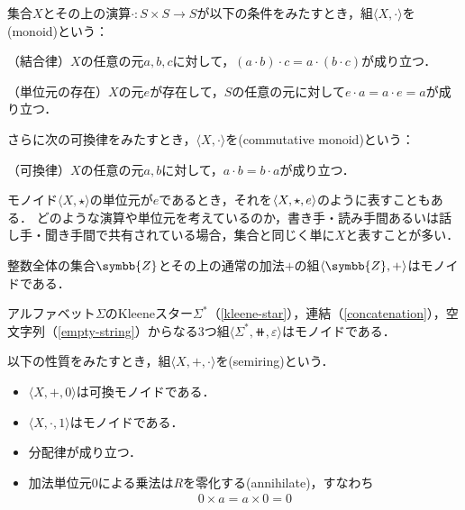 \documentclass[../main.tex]{subfiles}
\begin{document}
\begin{thmbox}
\begin{definition} 集合\(X\)とその上の演算\(\mathord{\cdot}\colon S \times S \to S\)が以下の条件をみたすとき，組\(\langle X, \mathord{\cdot} \rangle\)を(monoid)という：
\begin{conditions}
    \item （結合律）\(X\)の任意の元\(a, b, c\)に対して，\((a \cdot b) \cdot c = a \cdot (b \cdot c)\)が成り立つ．
    \item （単位元の存在）\(X\)の元\(e\)が存在して，\(S\)の任意の元に対して\(e \cdot a = a \cdot e = a\)が成り立つ．
\end{conditions}
さらに次の可換律をみたすとき，\(\langle X, \mathord{\cdot} \rangle\)を(commutative monoid)という：
\begin{conditions}[resume]
    \item （可換律）\(X\)の任意の元\(a, b\)に対して，\(a \cdot b = b \cdot a\)が成り立つ．
\end{conditions}
\end{definition}
\end{thmbox}

モノイド\(\langle X, \mathord{\star} \rangle\)の単位元が\(e\)であるとき，それを\(\langle  X, \mathord{\star}, e  \rangle\)のように表すこともある．
どのような演算や単位元を考えているのか，書き手・読み手間あるいは話し手・聞き手間で共有されている場合，集合と同じく単に\(X\)と表すことが多い．

\begin{exa} 整数全体の集合\(\symbb{Z}\)とその上の通常の加法\(\mathord{+}\)の組\(\tuple{ \symbb{Z}, \mathord{+} }\)はモノイドである．
\end{exa}

\begin{exa} アルファベット\(\Sigma\)のKleeneスター\(\Sigma^{\mathord{*}}\)（\eqref{kleene-star}），連結（\eqref{concatenation}），空文字列（\eqref{empty-string}）からなる3つ組\(\langle \Sigma^{\mathord{*}}, \doubleplus, \varepsilon \rangle\)はモノイドである．
\end{exa}

\begin{thmbox}
\begin{definition} 以下の性質をみたすとき，組\(\langle X, \mathord{+}, \mathord{\cdot} \rangle\)を(semiring)という．
\begin{itemize}
    \item \(\langle X, \mathord{+}, 0 \rangle\)は可換モノイドである．
    \item \(\langle X, \mathord{\cdot}, 1 \rangle\)はモノイドである．
    \item 分配律が成り立つ．
    \item 加法単位元\(0\)による乗法は\(R\)を零化する(annihilate)，すなわち
        \begin{align}
            0 \times a = a \times 0 = 0
        \end{align}
\end{itemize}
\end{definition}
\end{thmbox}
\end{document}
